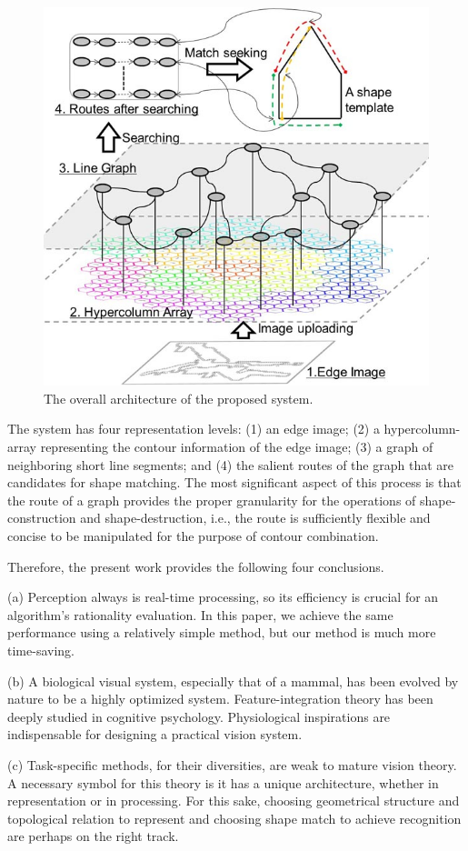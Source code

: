\documentclass[journal]{IEEEtran}
\begin{document}
\begin{figure}[!t]
\centering
\includegraphics[width=0.6\linewidth]{images/fig24.jpg}
\caption{The overall architecture of the proposed system.}
\label{fig:24}
\end{figure}

The system has four representation levels: 
(1) an edge image; (2) a hypercolumn-array representing the contour information of the edge image; 
(3) a graph of neighboring short line segments; 
and (4) the salient routes of the graph that are candidates for shape matching. 
The most significant aspect of this process is that the route of a graph provides the proper granularity for the operations of shape-construction and shape-destruction, i.e., the route is sufficiently flexible and concise to be manipulated for the purpose of contour combination.

Therefore, the present work provides the following four conclusions.

(a) Perception always is real-time processing, so its efficiency is crucial for an algorithm's rationality evaluation. In this paper, we achieve the same performance using a relatively simple method, but our method is much more time-saving.

(b) A biological visual system, especially that of a mammal, has been evolved by nature to be a highly optimized system. Feature-integration theory has been deeply studied in cognitive psychology. Physiological inspirations are indispensable for designing a practical vision system.

(c) Task-specific methods, for their diversities, are weak to mature vision theory. A necessary symbol for this theory is it has a unique architecture, whether in representation or in processing. For this sake, choosing geometrical structure and topological relation to represent and choosing shape match to achieve recognition are perhaps on the right track.
\end{document}
